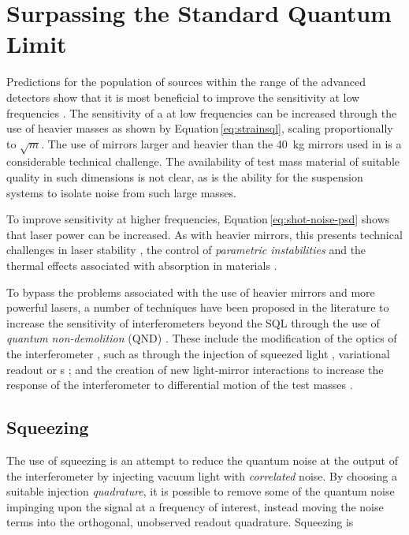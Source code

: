 \section{\label{sec:sub-sql-techniques}Surpassing the Standard Quantum Limit}
Predictions for the population of sources within the range of the advanced detectors show that it is most beneficial to improve the sensitivity at low frequencies \cite{Sathyaprakash2012}. The sensitivity of a \MI{} at low frequencies can be increased through the use of heavier masses as shown by Equation\,\ref{eq:strainsql}, scaling proportionally to $\sqrt{m}$. The use of mirrors larger and heavier than the \SI{40}{\kilo\gram} mirrors used in \ALIGO{} is a considerable technical challenge. The availability of test mass material of suitable quality in such dimensions is not clear, as is the ability for the suspension systems to isolate noise from such large masses.

To improve sensitivity at higher frequencies, Equation\,\ref{eq:shot-noise-psd} shows that laser power can be increased. As with heavier mirrors, this presents technical challenges in laser stability \cite{Hildebrandt2007}, the control of \emph{parametric instabilities} \cite{Evans2015} and the thermal effects associated with absorption in materials \cite{Steinlechner2016}.

To bypass the problems associated with the use of heavier mirrors and more powerful lasers, a number of techniques have been proposed in the literature to increase the sensitivity of interferometers beyond the \gls{SQL} through the use of \emph{quantum non-demolition} (\gls{QND}) \cite{Braginsky1995}. These include the modification of the optics of the interferometer \cite{Kimble2001}, such as through the injection of squeezed light \cite{Caves1981}, variational readout \cite{Vyatchanin1995, Vyatchanin1996} or \SM{}s \cite{Braginsky1990}; and the creation of new light-mirror interactions to increase the response of the interferometer to differential motion of the test masses \cite{Chen2011}.

\subsection{\label{sec:squeezing}Squeezing}
The use of squeezing is an attempt to reduce the quantum noise at the output of the interferometer by injecting vacuum light with \emph{correlated} noise. By choosing a suitable injection \emph{quadrature}, it is possible to remove some of the quantum noise impinging upon the signal at a frequency of interest, instead moving the noise terms into the orthogonal, unobserved readout quadrature. Squeezing is particularly favourable in combination with \gls{DC} readout, a combination currently implemented in \GEO{} \cite{Willke2006, Affeldt2014}.

